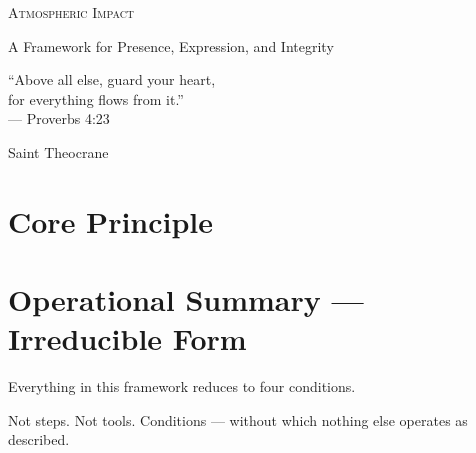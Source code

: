 \documentclass[12pt, a4paper]{article}
\begin{document}

\begin{titlepage}

\centering

\vspace*{3.5cm}

{\fontsize{30}{38}\selectfont\scshape Atmospheric Impact}

\vspace{0.7em}\par

{\large\color{midgray} A Framework for Presence, Expression, and Integrity}

\vspace{2.5cm}

\begin{sidequote}

``Above all else, guard your heart,\\

for everything flows from it.''\\[0.4em]

\normalfont\small\color{midgray} --- Proverbs 4:23

\end{sidequote}

\vfill

{\color{midgray}\small Saint Theocrane}

\end{titlepage}

\tableofcontents

\newpage


\section{Core Principle}\label{sec:core_principle}



\section{Operational Summary --- Irreducible Form}

Everything in this framework reduces to four conditions.

Not steps. Not tools. Conditions --- without which nothing else operates as described.
\end{document}
